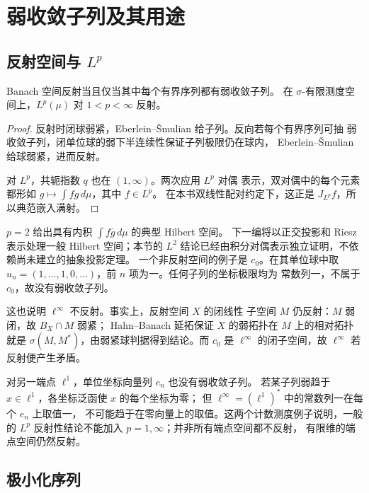 \section{弱收敛子列及其用途}

\subsection{反射空间与 \texorpdfstring{\(L^p\)}{Lp}}

\begin{corollary}\label{cor:reflexive-bounded-subsequence}
Banach 空间反射当且仅当其中每个有界序列都有弱收敛子列。
在 \(\sigma\)-有限测度空间上，\(L^p(\mu)\) 对 \(1<p<\infty\) 反射。
\end{corollary}
\begin{proof}
反射时闭球弱紧，Eberlein--Šmulian 给子列。反向若每个有界序列可抽
弱收敛子列，闭单位球的弱下半连续性保证子列极限仍在球内，
Eberlein--Šmulian 给球弱紧，进而反射。

对 \(L^p\)，共轭指数 \(q\) 也在 \((1,\infty)\)。两次应用 \(L^p\) 对偶
表示，双对偶中的每个元素都形如
\(g\mapsto\int fg\,d\mu\)，其中 \(f\in L^p\)。
在本书双线性配对约定下，这正是 \(J_{L^p}f\)，所以典范嵌入满射。
\end{proof}

\(p=2\) 给出具有内积 \(\int f\overline g\,d\mu\) 的典型 Hilbert 空间。
下一编将以正交投影和 Riesz 表示处理一般 Hilbert 空间；本节的 \(L^2\)
结论已经由积分对偶表示独立证明，不依赖尚未建立的抽象投影定理。
一个非反射空间的例子是 \(c_0\)。在其单位球中取
\(u_n=(1,\ldots,1,0,\ldots)\)，前 \(n\) 项为一。任何子列的坐标极限均为
常数列一，不属于 \(c_0\)，故没有弱收敛子列。

这也说明 \(\ell^\infty\) 不反射。事实上，反射空间 \(X\) 的闭线性
子空间 \(M\) 仍反射：\(M\) 弱闭，故 \(B_X\cap M\) 弱紧；
Hahn--Banach 延拓保证 \(X\) 的弱拓扑在 \(M\) 上的相对拓扑就是
\(\sigma(M,M^*)\)，由弱紧球判据得到结论。而 \(c_0\) 是
\(\ell^\infty\) 的闭子空间，故 \(\ell^\infty\) 若反射便产生矛盾。

对另一端点 \(\ell^1\)，单位坐标向量列 \(e_n\) 也没有弱收敛子列。
若某子列弱趋于 \(x\in\ell^1\)，各坐标泛函使 \(x\) 的每个坐标为零；
但 \(\ell^\infty=(\ell^1)^*\) 中的常数列一在每个 \(e_n\) 上取值一，
不可能趋于在零向量上的取值。这两个计数测度例子说明，一般的
\(L^p\) 反射性结论不能加入 \(p=1,\infty\)；并非所有端点空间都不反射，
有限维的端点空间仍然反射。

\subsection{极小化序列}

